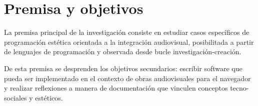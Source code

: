 \section*{Premisa y objetivos}


La premisa principal de la investigación consiste en estudiar casos específicos de programación estética orientada a la integración audiovisual, posibilitada a partir de lenguajes de programación y observada desde bucle investigación-creación. 

De esta premisa se desprenden los objetivos secundarios: escribir software que pueda ser implementado en el contexto de obras audiovisuales para el navegador y realizar reflexiones a manera de documentación que vinculen conceptos tecno-sociales y estéticos. 

